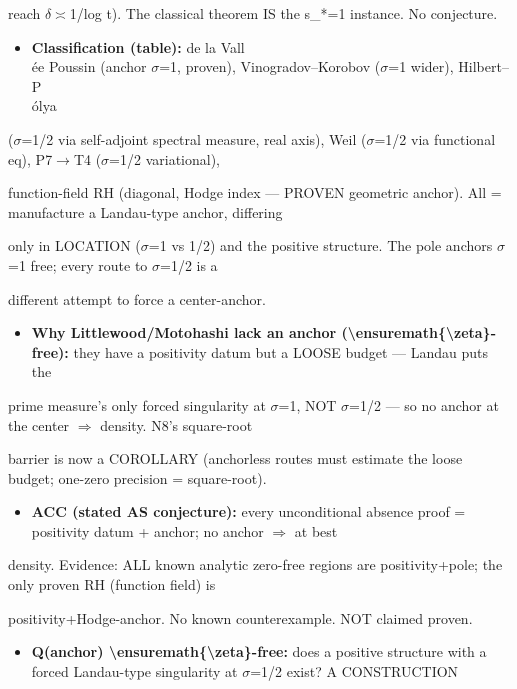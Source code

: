\documentclass[10pt]{article}
\begin{document}
  reach \ensuremath{\delta}\ensuremath{\asymp}1/log t). The classical theorem IS the s\_*=1 instance. No conjecture.\par
\begin{itemize}
\item \textbf{Classification (table):} de la Vall\\\'ee Poussin (anchor \ensuremath{\sigma}=1, proven), Vinogradov--Korobov (\ensuremath{\sigma}=1 wider), Hilbert--P\\\'olya
\end{itemize}
  (\ensuremath{\sigma}=1/2 via self-adjoint spectral measure, real axis), Weil (\ensuremath{\sigma}=1/2 via functional eq), P7\ensuremath{\to}T4 (\ensuremath{\sigma}=1/2 variational),\par
  function-field RH (diagonal, Hodge index --- PROVEN geometric anchor). All = manufacture a Landau-type anchor, differing\par
  only in LOCATION (\ensuremath{\sigma}=1 vs 1/2) and the positive structure. The pole anchors \ensuremath{\sigma}=1 free; every route to \ensuremath{\sigma}=1/2 is a\par
  different attempt to force a center-anchor.\par
\begin{itemize}
\item \textbf{Why Littlewood/Motohashi lack an anchor (\textbackslash{}ensuremath\{\textbackslash{}zeta\}-free):} they have a positivity datum but a LOOSE budget --- Landau puts the
\end{itemize}
  prime measure's only forced singularity at \ensuremath{\sigma}=1, NOT \ensuremath{\sigma}=1/2 --- so no anchor at the center \ensuremath{\Rightarrow} density. N8's square-root\par
  barrier is now a COROLLARY (anchorless routes must estimate the loose budget; one-zero precision = square-root).\par
\begin{itemize}
\item \textbf{ACC (stated AS conjecture):} every unconditional absence proof = positivity datum + anchor; no anchor \ensuremath{\Rightarrow} at best
\end{itemize}
  density. Evidence: ALL known analytic zero-free regions are positivity+pole; the only proven RH (function field) is\par
  positivity+Hodge-anchor. No known counterexample. NOT claimed proven.\par
\begin{itemize}
\item \textbf{Q(anchor) \textbackslash{}ensuremath\{\textbackslash{}zeta\}-free:} does a positive structure with a forced Landau-type singularity at \ensuremath{\sigma}=1/2 exist? A CONSTRUCTION
\end{itemize}
\end{document}
